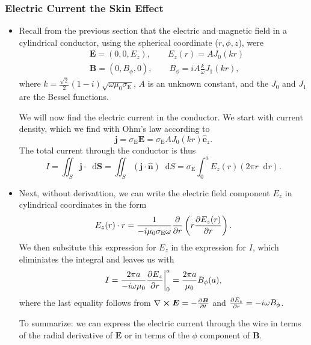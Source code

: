 \documentclass[11pt, a4paper]{article}
\newcommand{\diff}{\mathop{}\!\mathrm{d}} %
\renewcommand{\vec}[1]{\bm{#1}} %
\newcommand{\uvec}[1]{\hat{\vec{#1}}} %
\newcommand{\E}{\vec{E}} %
\newcommand{\B}{\vec{B}} %
\newcommand{\mm}{\mu_{0}}  %
\renewcommand{\j}{\vec{j}}  %
\renewcommand{\curl}{\nabla \cross}
\begin{document}
\subsubsection{Electric Current the Skin Effect}
\begin{itemize}
	\item Recall from the previous section that the electric and magnetic field in a cylindrical conductor, using the spherical coordinate ($ r, \phi, z $), were
	\begin{align*}
		& \E = (0, 0, E_{z}), \qquad E_{z}(r) = A J_{0}(kr) \\
		& \B = (0, B_{\phi}, 0), \qquad B_{\phi} = i A \frac{k}{\omega} J_{1}(kr),
	\end{align*}
	where $ k = \frac{\sqrt{2}}{2}(1- i)\sqrt{\omega \mm \sigma_{\text{E}}} $, $ A $ is an unknown constant, and the $ J_{0} $ and $ J_{1} $ are the Bessel functions.
	
	We will now find the electric current in the conductor. We start with current density, which we find with Ohm's law according to
	\begin{equation*}
		\j = \sigma_{\text{E}}\E = \sigma_{\text{E}}AJ_{0}(kr)\uvec{e}_{z}.
	\end{equation*}
	The total current through the conductor is thus
	\begin{equation*}
		I = \iint_{S} \j \cdot \diff \vec{S} = \iint_{S} (\j \cdot \uvec{n})\diff S = \sigma_{\text{E}} \int_{0}^{a}E_{z}(r)(2\pi r\diff r).
	\end{equation*}
	
	\item Next, without derivattion, we can write the electric field component $ E_{z} $ in cylindrical coordinates in the form
	\begin{equation*}
		E_{z}(r) \cdot r = \frac{1}{-i\mm \sigma_{\text{E}}\omega} \pdv{r}\left(r \pdv{E_{z}(r)}{r}\right).
	\end{equation*}
	We then subsitute this expression for $ E_{z} $ in the expression for $ I $, which eliminiates the integral and leaves us with
	\begin{equation*}
		I = \frac{2\pi a}{-i\omega \mm}\pdv{E_{z}}{r}\bigg |_{0}^{a} = \frac{2\pi a}{\mm}B_{\phi}(a),
	\end{equation*}
	where the last equality follows from $ \curl \E = - \pdv{\B}{t} $ and $ \pdv{E_{z}}{r} = -i \omega B_{\phi}$.
	
	To summarize: we can express the electric current through the wire in terms of the radial derivative of $ \E $ or in terms of the $ \phi $ component of $ \B $. 
	
\end{itemize}
\end{document}
